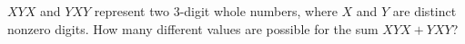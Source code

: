$XYX$ and $YXY$ represent two $3$-digit whole numbers, where $X$ and $Y$ are distinct nonzero digits. How many different values are possible for the sum $XYX+YXY$?
